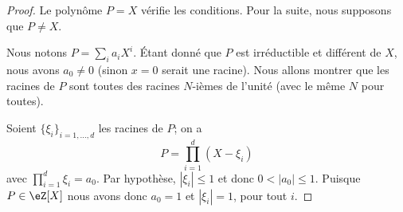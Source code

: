 \begin{proof}
	Le polynôme \( P=X\) vérifie les conditions. Pour la suite, nous supposons que \( P\neq X\).

	Nous notons \( P=\sum_ia_iX^i\). Étant donné que \( P\) est irréductible et différent de \( X\), nous avons \( a_0\neq 0\) (sinon \( x=0\) serait une racine). Nous allons montrer que les racines de \( P\) sont toutes des racines \( N\)-ièmes de l'unité (avec le même \( N\) pour toutes).

	Soient \( \{ \xi_i \}_{i=1,\ldots, d}\) les racines de \( P\); on a
	\begin{equation}
		P=\prod_{i=1}^d(X-\xi_i)
	\end{equation}
	avec \( \prod_{i=1}^d\xi_i=a_0\). Par hypothèse, \( | \xi_i |\leq 1\) et donc \( 0<| a_0 |\leq 1\). Puisque \( P\in \eZ[X]\) nous avons donc \( a_0=1\) et \( | \xi_i |=1\), pour tout \( i\).


\end{proof}
